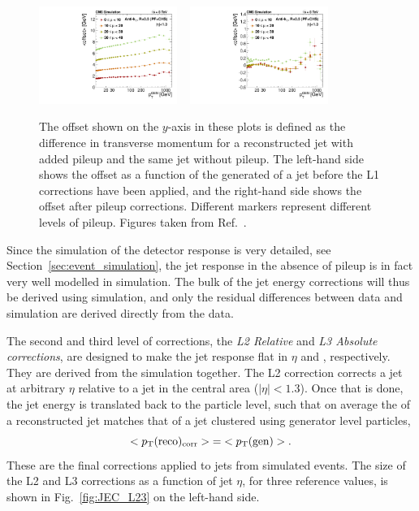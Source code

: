 \begin{figure}[tpb]
  \centering
  \includegraphics[width=0.4\textwidth]{figures/eventreco_objects/OffMeantnpuRef_BB_ak5pfchs}
  ~
  \includegraphics[width=0.4\textwidth]{figures/eventreco_objects/OffMeantnpuRef_BB_ak5pfchsl1}
  \caption{The offset shown on the $y$-axis in these plots is defined as the difference in
transverse momentum for a reconstructed jet with added pileup and the same jet without pileup.
The left-hand side shows the offset as a function of the generated \pt of a jet before the L1
corrections have been applied, and the right-hand side shows the offset after pileup
corrections. Different markers represent different levels of pileup. Figures taken from
Ref.~\cite{JEC_plots}.
  \label{fig:JEC_L1}}
\end{figure}

Since the simulation of the detector response is very detailed, see
Section~\ref{sec:event_simulation}, the jet response in the absence of pileup is in fact very well
modelled in simulation. The bulk of the jet energy corrections will thus be derived using
simulation, and only the residual differences between data and simulation are derived directly
from the data.

The second and third level of corrections, the \textit{L2 Relative} and \textit{L3 Absolute
corrections}, are designed to make the jet response flat in $\eta$ and \pt, respectively. They are
derived from the simulation together. The L2 correction corrects a jet at arbitrary $\eta$ relative
to a jet in the central area ($|\eta|<1.3$). Once that is done, the jet energy is translated back to
the particle level, such that on average the \pt of a reconstructed jet matches that of a jet
clustered using generator level particles,
\begin{equation}
  <p_{\mathrm{T}}(\mathrm{reco})_{\mathrm{corr}}> {=} <p_{\mathrm{T}}(\mathrm{gen})> .
\end{equation}
These are the final corrections applied to jets from simulated events. The size of the L2 and L3
corrections as a function of jet $\eta$, for three reference \pt values, is shown in
Fig.~\ref{fig:JEC_L23} on the left-hand side. 

